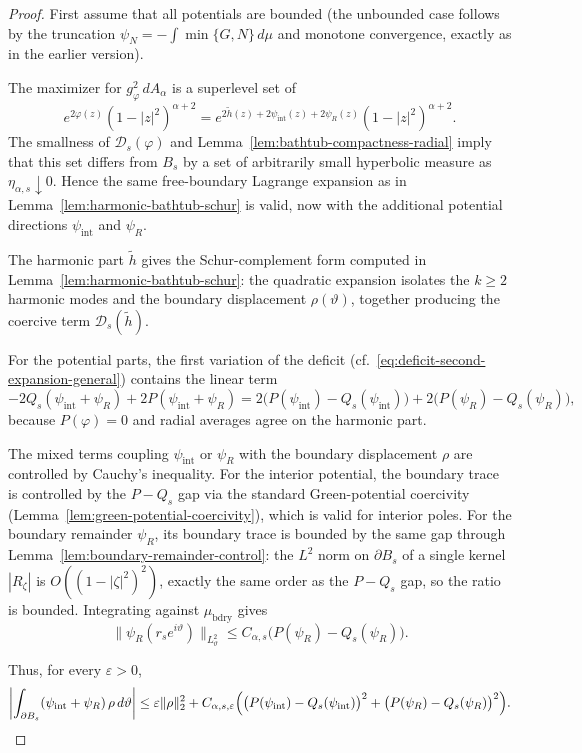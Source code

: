 \begin{proof}
First assume that all potentials are bounded (the unbounded case follows by
the truncation $\psi_N=-\int\min\{G,N\}\,d\mu$ and monotone convergence,
exactly as in the earlier version).

The maximizer for $g_\varphi^2\,dA_\alpha$ is a superlevel set of
\[
e^{2\varphi(z)}(1-|z|^2)^{\alpha+2}
=
e^{2\widetilde h(z)+2\psi_{\mathrm{int}}(z)+2\psi_R(z)}(1-|z|^2)^{\alpha+2}.
\]
The smallness of $\mathcal D_s(\varphi)$ and
Lemma~\ref{lem:bathtub-compactness-radial} imply that this set differs from
$B_s$ by a set of arbitrarily small hyperbolic measure as
$\eta_{\alpha,s}\downarrow0$.  Hence the same free-boundary Lagrange
expansion as in Lemma~\ref{lem:harmonic-bathtub-schur} is valid, now with
the additional potential directions $\psi_{\mathrm{int}}$ and $\psi_R$.

The harmonic part $\widetilde h$ gives the Schur-complement form computed in
Lemma~\ref{lem:harmonic-bathtub-schur}: the quadratic expansion isolates the
$k\ge2$ harmonic modes and the boundary displacement $\rho(\vartheta)$,
together producing the coercive term $\mathcal D_s(\widetilde h)$.

For the potential parts, the first variation of the deficit
(cf.\ \eqref{eq:deficit-second-expansion-general}) contains the linear term
\[
-2Q_s(\psi_{\mathrm{int}}+\psi_R)+2P(\psi_{\mathrm{int}}+\psi_R)
=2\bigl(P(\psi_{\mathrm{int}})-Q_s(\psi_{\mathrm{int}})\bigr)
+2\bigl(P(\psi_R)-Q_s(\psi_R)\bigr),
\]
because $P(\varphi)=0$ and radial averages agree on the harmonic part.

The mixed terms coupling $\psi_{\mathrm{int}}$ or $\psi_R$ with the
boundary displacement $\rho$ are controlled by Cauchy's inequality.
For the interior potential, the boundary trace is controlled by the
$P-Q_s$ gap via the standard Green-potential coercivity
(Lemma~\ref{lem:green-potential-coercivity}), which is valid for interior
poles.  For the boundary remainder $\psi_R$, its boundary trace is bounded
by the same gap through Lemma~\ref{lem:boundary-remainder-control}:
the $L^2$ norm on $\partial B_s$ of a single kernel $|R_\zeta|$ is
$O((1-|\zeta|^2)^2)$, exactly the same order as the $P-Q_s$ gap, so the
ratio is bounded.  Integrating against $\mu_{\mathrm{bdry}}$ gives
\[
\|\psi_R(r_se^{i\vartheta})\|_{L^2_\vartheta}
\le
C_{\alpha,s}\bigl(P(\psi_R)-Q_s(\psi_R)\bigr).
\]

Thus, for every $\varepsilon>0$,
\[
\left|\int_{\partial B_s}(\psi_{\mathrm{int}}+\psi_R)\,\rho\,d\vartheta\right|
\le
\varepsilon\|\rho\|_2^2
+C_{\alpha,s,\varepsilon}\Bigl(
\bigl(P(\psi_{\mathrm{int}})-Q_s(\psi_{\mathrm{int}})\bigr)^2
+\bigl(P(\psi_R)-Q_s(\psi_R)\bigr)^2\Bigr).
\]


\end{proof}
